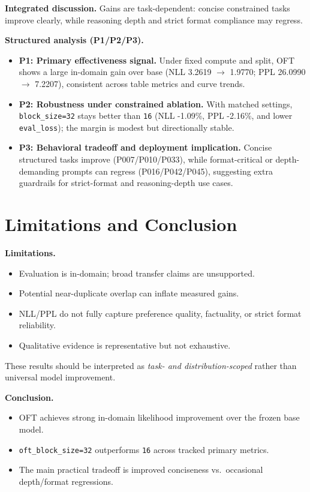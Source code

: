 \documentclass{article}
\begin{document}
\textbf{Integrated discussion.} Gains are task-dependent: concise constrained tasks improve clearly, while reasoning depth and strict format compliance may regress.

\textbf{Structured analysis (P1/P2/P3).}
\begin{itemize}[leftmargin=*]
  \item \textbf{P1: Primary effectiveness signal.} Under fixed compute and split, OFT shows a large in-domain gain over base (NLL 3.2619 $\rightarrow$ 1.9770; PPL 26.0990 $\rightarrow$ 7.2207), consistent across table metrics and curve trends.
  \item \textbf{P2: Robustness under constrained ablation.} With matched settings, \texttt{block\_size=32} stays better than \texttt{16} (NLL -1.09\%, PPL -2.16\%, and lower \texttt{eval\_loss}); the margin is modest but directionally stable.
  \item \textbf{P3: Behavioral tradeoff and deployment implication.} Concise structured tasks improve (P007/P010/P033), while format-critical or depth-demanding prompts can regress (P016/P042/P045), suggesting extra guardrails for strict-format and reasoning-depth use cases.
\end{itemize}

\section{Limitations and Conclusion}
\textbf{Limitations.}
\begin{itemize}[leftmargin=*]
  \item Evaluation is in-domain; broad transfer claims are unsupported.
  \item Potential near-duplicate overlap can inflate measured gains.
  \item NLL/PPL do not fully capture preference quality, factuality, or strict format reliability.
  \item Qualitative evidence is representative but not exhaustive.
\end{itemize}

These results should be interpreted as \emph{task- and distribution-scoped} rather than universal model improvement.

\textbf{Conclusion.}
\begin{itemize}[leftmargin=*]
  \item OFT achieves strong in-domain likelihood improvement over the frozen base model.
  \item \texttt{oft\_block\_size=32} outperforms \texttt{16} across tracked primary metrics.
  \item The main practical tradeoff is improved conciseness vs.\ occasional depth/format regressions.
\end{itemize}
\end{document}
